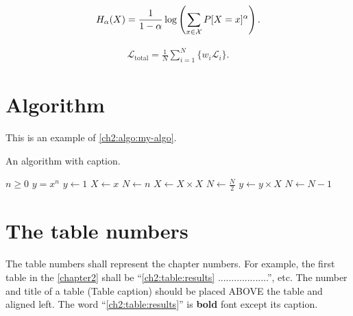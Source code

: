 \begin{equation}
\label{ch2:eq:renyi}
H_{\alpha}(X) =
\frac{1}{1-\alpha}
\log \left(\sum_{x \in {\cal X}}P[X=x]^{\alpha} \right) .
\end{equation}

\begin{equation} 
\label{ch2:eq:total-loss}
\begin{aligned}
\mathcal{L}_{\textrm{total}} = \frac{1}{N}\sum_{i=1}^{N}\{w_i\mathcal{L}_i\}. 
\end{aligned}
\end{equation}


\section{Algorithm}

\begin{paragraph}
This is an example of \autoref{ch2:algo:my-algo}.
\end{paragraph}

\begin{algorithm}[h]
\caption{An algorithm with caption.}
\label{ch2:algo:my-algo}
\normalsize\singlespacing
\begin{algorithmic}[1] %
    \Require $n \geq 0$
    \Ensure $y = x^n$
    \State $y \gets 1$
    \State $X \gets x$
    \State $N \gets n$
        \State $X \gets X \times X$
        \State $N \gets \frac{N}{2}$  
        \State $y \gets y \times X$
        \State $N \gets N - 1$
    \EndIf
    \EndWhile
\end{algorithmic}
\end{algorithm}



\section{The table numbers}

\begin{paragraph}
The table numbers shall represent the chapter numbers. For example, the first table in the \autoref{chapter2} shall be ``\autoref{ch2:table:results} ...................'', etc. The number and title of a table (Table caption) should be placed ABOVE the table and aligned left. The word ``\autoref{ch2:table:results}'' is \textbf{bold} font except its caption. 
\end{paragraph}

